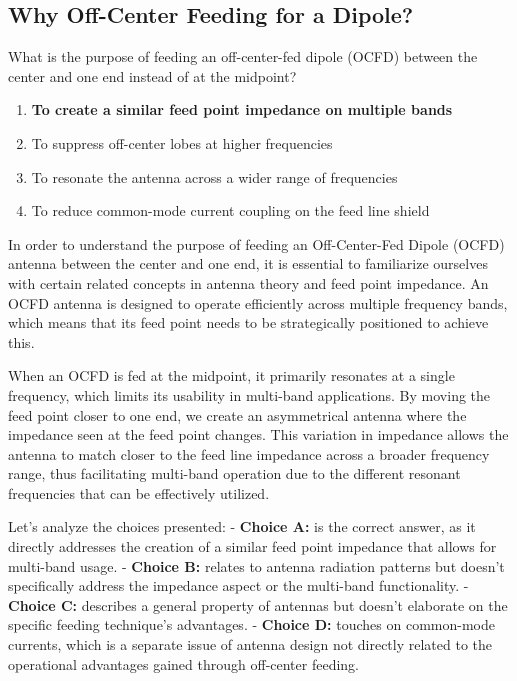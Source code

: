 \subsection{Why Off-Center Feeding for a Dipole?}

\begin{tcolorbox}[colback=gray!10, colframe=black, title=E9C05] What is the purpose of feeding an off-center-fed dipole (OCFD) between the center and one end instead of at the midpoint?
\begin{enumerate}[label=\Alph*.]
    \item \textbf{To create a similar feed point impedance on multiple bands}
    \item To suppress off-center lobes at higher frequencies
    \item To resonate the antenna across a wider range of frequencies
    \item To reduce common-mode current coupling on the feed line shield
\end{enumerate} \end{tcolorbox}

In order to understand the purpose of feeding an Off-Center-Fed Dipole (OCFD) antenna between the center and one end, it is essential to familiarize ourselves with certain related concepts in antenna theory and feed point impedance. An OCFD antenna is designed to operate efficiently across multiple frequency bands, which means that its feed point needs to be strategically positioned to achieve this.

When an OCFD is fed at the midpoint, it primarily resonates at a single frequency, which limits its usability in multi-band applications. By moving the feed point closer to one end, we create an asymmetrical antenna where the impedance seen at the feed point changes. This variation in impedance allows the antenna to match closer to the feed line impedance across a broader frequency range, thus facilitating multi-band operation due to the different resonant frequencies that can be effectively utilized.

Let's analyze the choices presented:
- \textbf{Choice A:} is the correct answer, as it directly addresses the creation of a similar feed point impedance that allows for multi-band usage.
- \textbf{Choice B:} relates to antenna radiation patterns but doesn't specifically address the impedance aspect or the multi-band functionality.
- \textbf{Choice C:} describes a general property of antennas but doesn't elaborate on the specific feeding technique's advantages.
- \textbf{Choice D:} touches on common-mode currents, which is a separate issue of antenna design not directly related to the operational advantages gained through off-center feeding.

